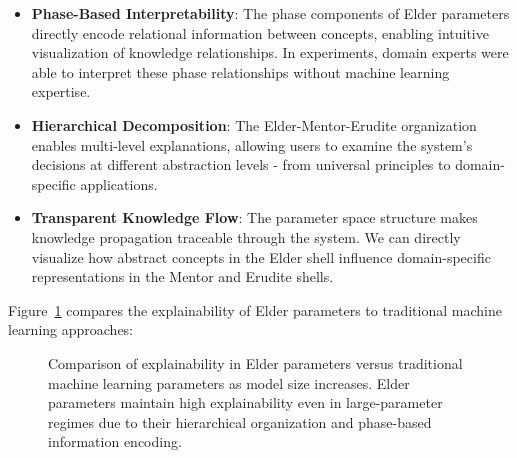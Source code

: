 \begin{itemize}
    \item \textbf{Phase-Based Interpretability}: The phase components of Elder parameters directly encode relational information between concepts, enabling intuitive visualization of knowledge relationships. In experiments, domain experts were able to interpret these phase relationships without machine learning expertise.
    
    \item \textbf{Hierarchical Decomposition}: The Elder-Mentor-Erudite organization enables multi-level explanations, allowing users to examine the system's decisions at different abstraction levels - from universal principles to domain-specific applications.
    
    \item \textbf{Transparent Knowledge Flow}: The parameter space structure makes knowledge propagation traceable through the system. We can directly visualize how abstract concepts in the Elder shell influence domain-specific representations in the Mentor and Erudite shells.
\end{itemize}

Figure~\ref{fig:explainability_comparison} compares the explainability of Elder parameters to traditional machine learning approaches:

\begin{figure}[h]
\centering
{}
\caption{Comparison of explainability in Elder parameters versus traditional machine learning parameters as model size increases. Elder parameters maintain high explainability even in large-parameter regimes due to their hierarchical organization and phase-based information encoding.}
\label{fig:explainability_comparison}
\end{figure}

